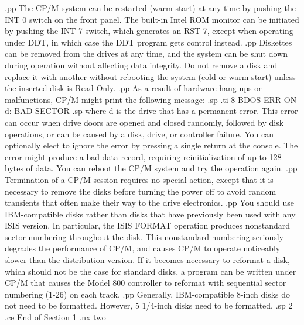 $$.pp
The CP/M system can be restarted (warm start) at any time by pushing the
INT 0 switch on the front panel.  The built-in Intel ROM monitor can be
initiated by pushing the INT 7 switch, which generates an RST 7, except when
operating under DDT, in which case the DDT program gets control instead.
.pp
Diskettes can be removed from the drives at any time, and the system can be
shut down during operation without affecting data integrity.  Do
not remove a disk and replace it with another without rebooting the
system (cold or warm start) unless the inserted disk is Read-Only.
.pp
As a result of hardware hang-ups or malfunctions, CP/M might 
print the following message:
.sp
.ti 8
BDOS ERR ON d: BAD SECTOR
.sp
where d is the drive that has a permanent error.  This error can occur when
drive doors are opened and closed randomly, followed by disk operations, or
can be caused by a disk, drive, or controller failure.  You can
optionally elect to ignore the error by pressing a single return at the
console.  The error might produce a bad data record, requiring
reinitialization
of up to 128 bytes of data.  You can reboot the CP/M system and try
the operation again.
.pp
Termination of a CP/M session requires no special action, except that it is
necessary to remove the disks before turning the power off to avoid
random transients that often make their way to the drive electronics.
.pp
You should use IBM-compatible disks rather than disks
that have previously been used with any ISIS version.  In particular, the
ISIS FORMAT operation produces nonstandard sector numbering throughout the
disk.  This nonstandard numbering seriously degrades the performance of
CP/M, and causes CP/M to operate noticeably slower than the distribution
version.  If it becomes necessary to reformat a disk, which 
should not be the case for standard disks, a program can be 
written under CP/M that causes the Model 800 controller to 
reformat with sequential sector numbering (1-26) on each track.
.pp
Generally, IBM-compatible 8-inch disks do not need to be formatted.
However, 5 1/4-inch disks need to be formatted.
.sp 2
.ce
End of Section 1
.nx two
